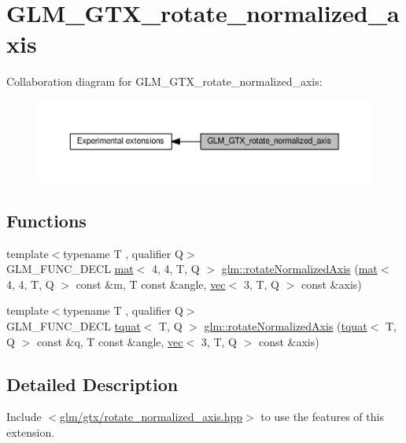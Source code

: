 \hypertarget{group__gtx__rotate__normalized__axis}{}\section{G\+L\+M\+\_\+\+G\+T\+X\+\_\+rotate\+\_\+normalized\+\_\+axis}
\label{group__gtx__rotate__normalized__axis}
Collaboration diagram for G\+L\+M\+\_\+\+G\+T\+X\+\_\+rotate\+\_\+normalized\+\_\+axis\+:
\nopagebreak
\begin{figure}[H]
\begin{center}
\leavevmode
\includegraphics[width=350pt]{d4/de8/group__gtx__rotate__normalized__axis}
\end{center}
\end{figure}
\subsection*{Functions}
\begin{DoxyCompactItemize}
\item 
{\footnotesize template$<$typename T , qualifier Q$>$ }\\G\+L\+M\+\_\+\+F\+U\+N\+C\+\_\+\+D\+E\+CL \hyperlink{structglm_1_1mat}{mat}$<$ 4, 4, T, Q $>$ \hyperlink{group__gtx__rotate__normalized__axis_ga50efd7ebca0f7a603bb3cc11e34c708d}{glm\+::rotate\+Normalized\+Axis} (\hyperlink{structglm_1_1mat}{mat}$<$ 4, 4, T, Q $>$ const \&m, T const \&angle, \hyperlink{structglm_1_1vec}{vec}$<$ 3, T, Q $>$ const \&axis)
\item 
{\footnotesize template$<$typename T , qualifier Q$>$ }\\G\+L\+M\+\_\+\+F\+U\+N\+C\+\_\+\+D\+E\+CL \hyperlink{structglm_1_1tquat}{tquat}$<$ T, Q $>$ \hyperlink{group__gtx__rotate__normalized__axis_gad5bb8a155ee52fd349b88cec3a843600}{glm\+::rotate\+Normalized\+Axis} (\hyperlink{structglm_1_1tquat}{tquat}$<$ T, Q $>$ const \&q, T const \&angle, \hyperlink{structglm_1_1vec}{vec}$<$ 3, T, Q $>$ const \&axis)
\end{DoxyCompactItemize}


\subsection{Detailed Description}
Include $<$\hyperlink{rotate__normalized__axis_8hpp}{glm/gtx/rotate\+\_\+normalized\+\_\+axis.\+hpp}$>$ to use the features of this extension.

